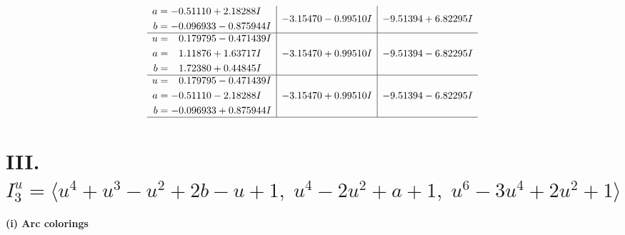 \documentclass[1p]{elsarticle_modified}
\theoremstyle{definition}
\begin{document}
$$\begin{array}{c|c|c}
\begin{aligned}
a &= -0.51110 + 2.18288 I \\
b &= -0.096933 - 0.875944 I\end{aligned}
 & -3.15470 - 0.99510 I & -9.51394 + 6.82295 I \\ \hline\begin{aligned}
u &= \phantom{-}0.179795 - 0.471439 I \\
a &= \phantom{-}1.11876 + 1.63717 I \\
b &= \phantom{-}1.72380 + 0.44845 I\end{aligned}
 & -3.15470 + 0.99510 I & -9.51394 - 6.82295 I \\ \hline\begin{aligned}
u &= \phantom{-}0.179795 - 0.471439 I \\
a &= -0.51110 - 2.18288 I \\
b &= -0.096933 + 0.875944 I\end{aligned}
 & -3.15470 + 0.99510 I & -9.51394 - 6.82295 I\\
 \hline 
 \end{array}$$\newpage\newpage\renewcommand{\arraystretch}{1}
\centering \section*{III. $I^u_{3}= \langle u^4+u^3- u^2+2 b- u+1,\;u^4-2 u^2+a+1,\;u^6-3 u^4+2 u^2+1 \rangle$}
\flushleft \textbf{(i) Arc colorings}\\
\end{document}
